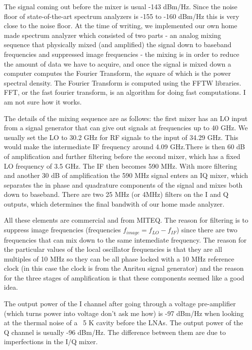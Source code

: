 \documentclass[11pt]{article}
\begin{document}
The signal coming out before the mixer is usual -143 dBm/Hz. Since the noise floor of state-of-the-art spectrum analyzers is -155 to -160 dBm/Hz this is very close to the noise floor. At the time of writing, we implemented our own home made spectrum analyzer which consisted of two parts - an analog mixing sequence that physically mixed (and amplified) the signal down to baseband frequencies and suppressed image frequencies - the mixing is in order to reduce the amount of data we have to acquire, and once the signal is mixed down a computer computes the Fourier Transform, the square of which is the power spectral density. The Fourier Transform is computed using the FFTW libraries. FFT, or the fast fourier transform, is an algorithm for doing fast computations. I am not sure how it works.

The details of the mixing sequence are as follows: the first mixer has an LO input from a signal generator that can give out signals at frequencies up to 40 GHz. We usually set the LO to 30.2 GHz for RF signals to the input of 34.29 GHz. This would make the intermediate IF frequency around 4.09 GHz.There is then 60 dB of amplification and further filtering before the second mixer, which has a fixed LO frequency of 3.5 GHz. The IF then becomes 590 MHz. With more filtering and another 30 dB of amplification the 590 MHz signal enters an IQ mixer, which separates the in phase and quadrature components of the signal and mixes both down to baseband. There are two 25 MHz (or 4MHz) filters on the I and Q outputs, which determines the final bandwith of our home made analyzer.

All these elements are commercial and from MITEQ. The reason for filtering is to suppress image frequencies (frequencies $f_{image} = f_{LO}-f_{IF}$) since there are two frequencies that can mix down to the same intemediate frequency. The reason for the particular values of the local oscillator frequencies is that they are all multiples of 10 MHz so they can be all phase locked with a 10 MHz reference clock (in this case the clock is from the Anritsu signal generator) and the reason for the three stages of amplification is that these components seemed like a good idea.

The output power of the I channel after going through a voltage pre-amplifier (which turns power into voltage don't ask me how) is -97 dBm/Hz when looking at the thermal noise of a ~5 K cavity before the LNAs. The output power of the Q channel is usually -96 dBm/Hz. The difference between them are due to imperfections in the I/Q mixer.
\end{document}
